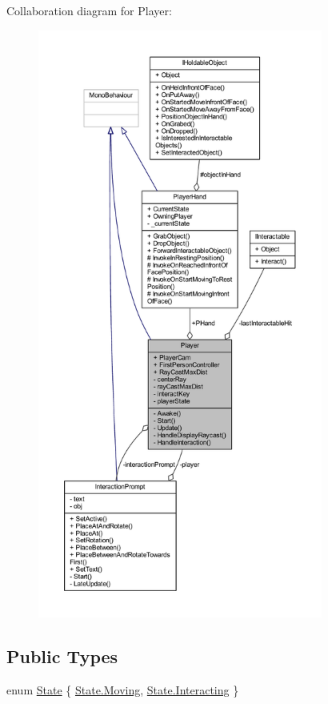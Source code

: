 Collaboration diagram for Player\+:
\nopagebreak
\begin{figure}[H]
\begin{center}
\leavevmode
\includegraphics[height=550pt]{class_player__coll__graph}
\end{center}
\end{figure}
\subsection*{Public Types}
\begin{DoxyCompactItemize}
\item 
enum \mbox{\hyperlink{class_player_aa3b6104791d642173caf761cf81f8c08}{State}} \{ \mbox{\hyperlink{class_player_aa3b6104791d642173caf761cf81f8c08adefe967ad0373b2274fc298f19125ca7}{State.\+Moving}}, 
\mbox{\hyperlink{class_player_aa3b6104791d642173caf761cf81f8c08af023446a52e84d38f186937dad1d8f76}{State.\+Interacting}}
 \}
\end{DoxyCompactItemize}
